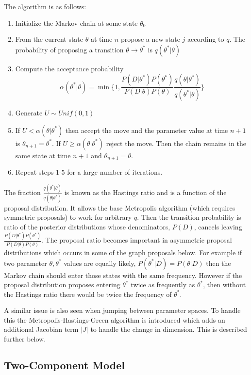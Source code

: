 \documentclass[11pt,a4paper]{article}
\numberwithin{equation}{section}
\begin{document}
The algorithm is as follows:

\begin{enumerate}
\def\labelenumi{\arabic{enumi}.}
\item
  Initialize the Markov chain at some state \(\theta_0\)
\item
  From the current state \(\theta\) at time \(n\) propose a new state
  \(j\) according to \(q\). The probability of proposing a transition
  \(\theta \rightarrow \theta^*\) is \(q(\theta^*|\theta)\)
\item
  Compute the acceptance probability
  \[\alpha(\theta^*|\theta) = \min\{1, \frac{P(D|\theta^*)P(\theta^*)}{P(D|\theta)P(\theta)}\frac{q(\theta|\theta^*)}{q(\theta^*|\theta)} \}\]
\item
  Generate \(U \sim Unif(0,1)\)
\item
  If \(U < \alpha(\theta|\theta^*)\) then accept the move and the
  parameter value at time \(n+1\) is \(\theta_{n+1} = \theta^*\). If
  \(U \geq \alpha(\theta|\theta^*)\) reject the move. Then the chain
  remains in the same state at time \(n+1\) and
  \(\theta_{n+1} = \theta\).
\item
  Repeat steps 1-5 for a large number of iterations.
\end{enumerate}

The fraction \(\frac{q(\theta^*|\theta)}{q(\theta|\theta^*)}\) is known
as the Hastings ratio and is a function of the proposal distribution. It
allows the base Metropolis algorithm (which requires symmetric
proposals) to work for arbitrary \(q\). Then the transition probability
is ratio of the posterior distributions whose denominators, \(P(D)\),
cancels leaving
\(\frac{P(D|\theta^*)P(\theta^*)}{P(D|\theta)P(\theta)}\). The proposal
ratio becomes important in asymmetric proposal distributions which
occurs in some of the graph proposals below. For example if two
parameter \(\theta, \theta^*\) values are equally likely,
\(P(\theta^*|D) = P(\theta|D)\) then the Markov chain should enter those
states with the same frequency. However if the proposal distribution
proposes entering \(\theta^*\) twice as frequently as \(\theta^*\), then
without the Hastings ratio there would be twice the frequency of
\(\theta^*\).

A similar issue is also seen when jumping between parameter spaces. To
handle this the Metropolis-Hastings-Green algorithm is introduced which
adds an additional Jacobian term \(|J|\) to handle the change in
dimension. This is described further below.

\hypertarget{two-component-model}{%
\subsection{Two-Component Model}\label{two-component-model}}
\end{document}
